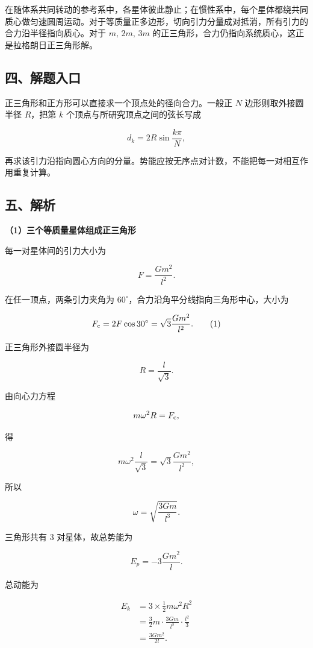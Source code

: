 \documentclass[12pt,a4paper,UTF8]{ctexart}
\begin{document}
在随体系共同转动的参考系中，各星体彼此静止；在惯性系中，每个星体都绕共同质心做匀速圆周运动。对于等质量正多边形，切向引力分量成对抵消，所有引力的合力沿半径指向质心。对于
\(m,\,2m,\,3m\)
的正三角形，合力仍指向系统质心，这正是拉格朗日正三角形解。

\subsection{四、解题入口}\label{ux56dbux89e3ux9898ux5165ux53e3-1}

正三角形和正方形可以直接求一个顶点处的径向合力。一般正 \(N\)
边形则取外接圆半径 \(R\)，把第 \(k\) 个顶点与所研究顶点之间的弦长写成

\[
d_k=2R\sin\frac{k\pi}{N},
\]

再求该引力沿指向圆心方向的分量。势能应按无序点对计数，不能把每一对相互作用重复计算。

\subsection{五、解析}\label{ux4e94ux89e3ux6790-1}

\textbf{（1）三个等质量星体组成正三角形}

每一对星体间的引力大小为

\[
F=\frac{Gm^2}{l^2}.
\]

在任一顶点，两条引力夹角为
\(60^\circ\)，合力沿角平分线指向三角形中心，大小为

\[
F_{\rm c}=2F\cos30^\circ
=\sqrt3\frac{Gm^2}{l^2}.
\tag{1}
\]

正三角形外接圆半径为

\[
R=\frac{l}{\sqrt3}.
\]

由向心力方程

\[
m\omega^2R=F_{\rm c},
\]

得

\[
m\omega^2\frac{l}{\sqrt3}
=\sqrt3\frac{Gm^2}{l^2},
\]

所以

\[
\boxed{\omega=\sqrt{\frac{3Gm}{l^3}}}.
\tag{2}
\]

三角形共有 \(3\) 对星体，故总势能为

\[
E_p=-3\frac{Gm^2}{l}.
\tag{3}
\]

总动能为

\[
\begin{aligned}
E_k
&=3\times\frac12m\omega^2R^2\\
&=\frac32m\cdot\frac{3Gm}{l^3}\cdot\frac{l^2}{3}\\
&=\frac{3Gm^2}{2l}.
\end{aligned}
\tag{4}
\]
\end{document}

